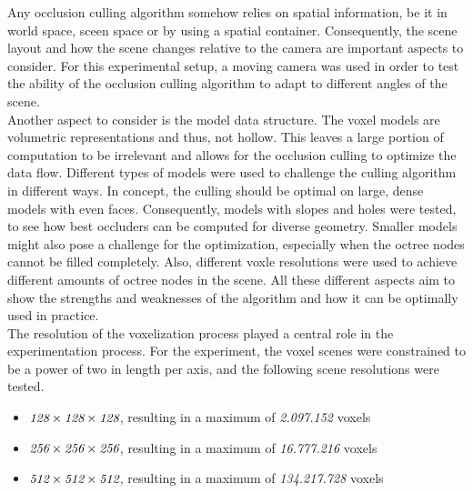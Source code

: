 Any occlusion culling algorithm somehow relies on spatial information, be it in world space, sceen space or by 
using a spatial container. Consequently, the scene layout and how the scene changes relative to the camera are 
important aspects to consider. For this experimental setup, a moving camera was used in order to test the ability 
of the occlusion culling algorithm to adapt to different angles of the scene. \\

Another aspect to consider is the model data structure. The voxel models are volumetric representations and thus, 
not hollow. This leaves a large portion of computation to be irrelevant and allows for the occlusion culling to 
optimize the data flow. Different types of models were used to challenge the culling algorithm in different ways. 
In concept, the culling should be optimal on large, dense models with even faces. Consequently, models with 
slopes and holes were tested, to see how best occluders can be computed for diverse geometry. Smaller models might 
also pose a challenge for the optimization, especially when the octree nodes cannot be filled completely. Also, 
different voxle resolutions were used to achieve different amounts of octree nodes in the scene. All these different 
aspects aim to show the strengths and weaknesses of the algorithm and how it can be optimally used in practice. \\

\noindent
The resolution of the voxelization process played a central role in the experimentation process.
For the experiment, the voxel scenes were constrained to be a power of two in length per axis, and the following
scene resolutions were tested.

\begin{itemize}
    \item \begin{math} \emph{128} \times \emph{128} \times \emph{128}\end{math}, resulting in a maximum of \emph{2.097.152} voxels
    \item \begin{math} \emph{256} \times \emph{256} \times \emph{256}\end{math}, resulting in a maximum of \emph{16.777.216} voxels
    \item \begin{math} \emph{512} \times \emph{512} \times \emph{512}\end{math}, resulting in a maximum of \emph{134.217.728} voxels
\end{itemize}

